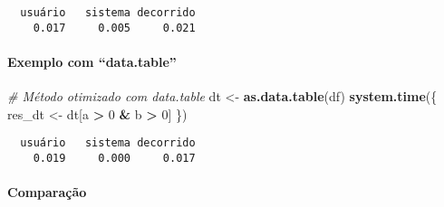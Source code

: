 \documentclass[
]{article}
\newenvironment{Shaded}{\begin{snugshade}}{\end{snugshade}}
\newcommand{\AttributeTok}[1]{\textcolor[rgb]{0.13,0.29,0.53}{#1}}
\newcommand{\CommentTok}[1]{\textcolor[rgb]{0.56,0.35,0.01}{\textit{#1}}}
\newcommand{\DecValTok}[1]{\textcolor[rgb]{0.00,0.00,0.81}{#1}}
\newcommand{\FunctionTok}[1]{\textcolor[rgb]{0.13,0.29,0.53}{\textbf{#1}}}
\newcommand{\NormalTok}[1]{#1}
\newcommand{\OtherTok}[1]{\textcolor[rgb]{0.56,0.35,0.01}{#1}}
\newcommand{\SpecialCharTok}[1]{\textcolor[rgb]{0.81,0.36,0.00}{\textbf{#1}}}
\begin{document}
\begin{verbatim}
  usuário   sistema decorrido 
    0.017     0.005     0.021 
\end{verbatim}

\paragraph{Exemplo com ``data.table''}\label{exemplo-com-data.table}

\begin{Shaded}
\begin{Highlighting}[]
\CommentTok{\# Método otimizado com data.table}
\NormalTok{dt }\OtherTok{\textless{}{-}} \FunctionTok{as.data.table}\NormalTok{(df)}
\FunctionTok{system.time}\NormalTok{(\{}
\NormalTok{  res\_dt }\OtherTok{\textless{}{-}}\NormalTok{ dt[a }\SpecialCharTok{\textgreater{}} \DecValTok{0} \SpecialCharTok{\&}\NormalTok{ b }\SpecialCharTok{\textgreater{}} \DecValTok{0}\NormalTok{]}
\NormalTok{\})}
\end{Highlighting}
\end{Shaded}

\begin{verbatim}
  usuário   sistema decorrido 
    0.019     0.000     0.017 
\end{verbatim}

\paragraph{Comparação}\label{comparauxe7uxe3o}

\begin{Shaded}
\end{Shaded}
\end{document}
